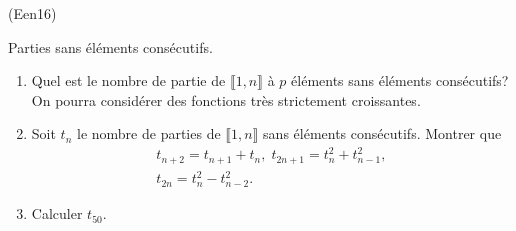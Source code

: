 \begin{tiny}(Een16)\end{tiny} Parties sans éléments consécutifs.
\begin{enumerate}
 \item Quel est le nombre de partie de $\llbracket 1,n \rrbracket$ à $p$ éléments sans éléments consécutifs? \newline
 On pourra considérer des fonctions \og très strictement croissantes\fg.
 \item Soit $t_n$ le nombre de parties de $\llbracket 1,n \rrbracket$ sans éléments consécutifs. Montrer que 
\begin{multline*}
 t_{n+2} = t_{n+1} +t_n, \; t_{2n+1} = t_{n}^2 + t_{n-1}^2, \\
 t_{2n} = t_{n}^2 - t_{n-2}^2.
\end{multline*}
 \item Calculer $t_{50}$.
\end{enumerate}
